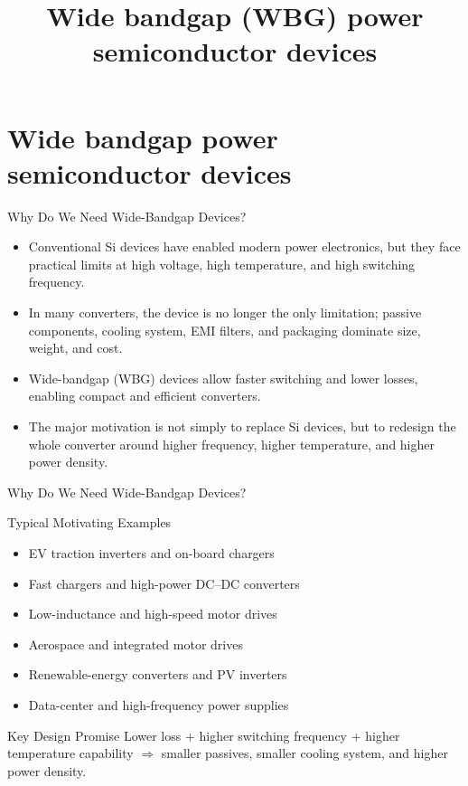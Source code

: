 \section{Wide bandgap power semiconductor devices}
\title[Wide bandgap power semiconductor devices]{Wide bandgap (WBG) power semiconductor devices}  

\begin{frame}[plain]
    \titlepage
\end{frame}


\begin{frame}{Why Do We Need Wide-Bandgap Devices?}

\begin{itemize}
    \item Conventional Si devices have enabled modern power electronics, but they face practical limits at high voltage, high temperature, and high switching frequency.
    \item In many converters, the device is no longer the only limitation; passive components, cooling system, EMI filters, and packaging dominate size, weight, and cost.
    \item Wide-bandgap (WBG) devices allow faster switching and lower losses, enabling compact and efficient converters.
    \item The major motivation is not simply to replace Si devices, but to redesign the whole converter around higher frequency, higher temperature, and higher power density.
\end{itemize}

\end{frame}


\begin{frame}{Why Do We Need Wide-Bandgap Devices?}

\begin{block}{Typical Motivating Examples}
\begin{itemize}
    \item EV traction inverters and on-board chargers
    \item Fast chargers and high-power DC--DC converters
    \item Low-inductance and high-speed motor drives
    \item Aerospace and integrated motor drives
    \item Renewable-energy converters and PV inverters
    \item Data-center and high-frequency power supplies
\end{itemize}
\end{block}

\begin{block}{Key Design Promise}
Lower loss + higher switching frequency + higher temperature capability
$\Rightarrow$ smaller passives, smaller cooling system, and higher power density.
\end{block}

\end{frame}


